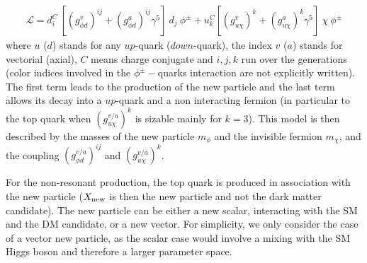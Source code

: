 \begin{eqnarray}
\label{eq:lagrangianResonant}
\mathcal{L} =  d^{C}_{i} \:  [ (g^{v}_{\phi d})^{ij} +  (g^{a}_{\phi d})^{ij} \gamma^{5} ] \: d_{j} \: \phi^{\pm}  +  u^{C}_{k}  [ (g^{v}_{u\chi})^{k} + (g^{a}_{u\chi})^{k} \gamma^{5} ] \: \chi \: \phi^{\pm}
\end{eqnarray}
where $u$ ($d$) stands for any $up$-quark ($down$-quark), 
the index $v$ ($a$) stands for vectorial (axial), $C$ means charge conjugate and $i,j,k$ 
run over the generations (color indices involved in the $\phi^{\pm}-$quarks interaction are not explicitly written).
The first term leads to the production of the new particle and the last term allows its decay into a $up$-quark 
and a non interacting fermion (in particular to the top quark when $(g^{v/a}_{u\chi})^{k}$ 
is sizable mainly for $k=3$).
This model is then described by the masses of the new particle $m_{\phi}$ and the invisible 
fermion $m_{\chi}$, and the coupling 
$(g^{v/a}_{\phi d})^{ij}$ and $(g^{v/a}_{u\chi})^{k}$.
% 
% 
% 
\label{sec:NonResonantProd}

For the non-resonant production, the top quark is produced in association with the new particle 
($X_{\mathrm{new}}$ is then the new particle and not the dark matter candidate). 
The new particle can be either a new scalar, interacting with the SM and the DM candidate, 
or a new vector. For simplicity, we only consider the case of a vector new particle, as the scalar case
would involve a mixing with the SM Higgs boson and therefore a larger parameter space. 


